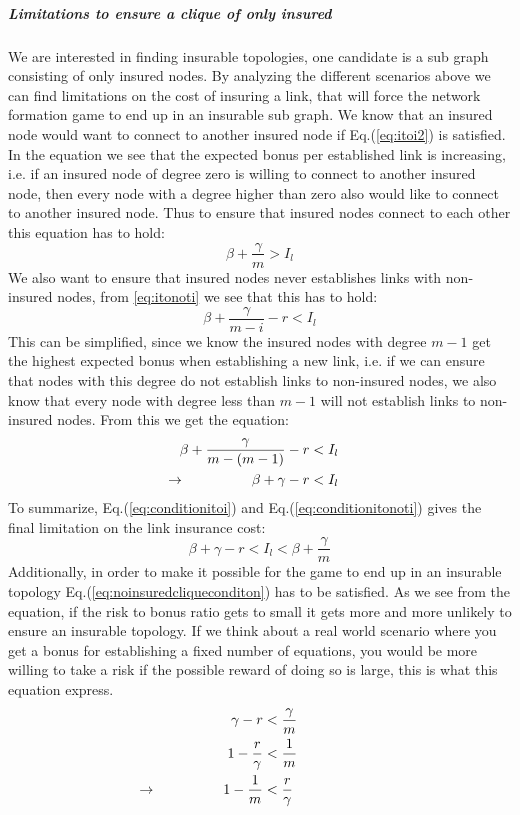 \subparagraph{Limitations to ensure a clique of only insured}
We are interested in finding insurable topologies, one candidate is a sub graph consisting of only insured nodes. By analyzing the different scenarios above we can find limitations on the cost of insuring a link, that will force the network formation game to end up in an insurable sub graph.
We know that an insured node would want to connect to another insured node if  Eq.(\ref{eq:itoi2}) is satisfied. 
In the equation we see that the expected bonus per established link is increasing, i.e. if an insured node of degree zero is willing to connect to another insured node, then every node with a degree higher than zero also would like to connect to another insured node. Thus to ensure that insured nodes connect to each other this equation has to hold:
\begin{equation}
\beta+\frac{\gamma}{m}>I_{l}
\label{eq:conditionitoi}
\end{equation}
We also want to ensure that insured nodes never establishes links with non-insured nodes, from \ref{eq:itonoti} we see that this has to hold:
\begin{equation}
\beta+\frac{\gamma}{m-i}-r < I_{l}
\label{eq:conditionitonoti}
\end{equation}
This can be simplified, since we know the insured nodes with degree $m-1$ get the highest expected bonus when establishing a new link, i.e. if we can ensure that nodes with this degree do not establish links to non-insured nodes, we also know that every node with degree less than $m-1$ will not establish links to non-insured nodes. From this we get the equation:
\begin{eqnarray}
\beta+\frac{\gamma}{m-(m-1)}-r&<I_{l} \nonumber\\
\llap{$\rightarrow$\hspace{50pt}} \beta+\gamma-r&<I_{l}
\label{eq:condition-i-to-noti}
\end{eqnarray}
To summarize, Eq.(\ref{eq:conditionitoi}) and Eq.(\ref{eq:conditionitonoti}) gives the final limitation on the link insurance cost:
\begin{equation}
\beta+\gamma-r<I_{l}<\beta+\frac{\gamma}{m}
\label{eq:final-insurance-clique-condition}
\end{equation}
Additionally, in order to make it possible for the game to end up in an insurable topology Eq.(\ref{eq:noinsuredcliqueconditon}) has to be satisfied. As we see from the equation, if the risk to bonus ratio gets to small it gets more and more unlikely to ensure an insurable topology. If we think about a real world scenario where you get a bonus for establishing a fixed number of equations, you would be more willing to take a risk if the possible reward of doing so is large, this is what this equation express. 
\begin{eqnarray}
\gamma-r &<\frac{\gamma}{m}\nonumber \\
1-\frac{r}{\gamma}&<\frac{1}{m} \nonumber \\
\llap{$\rightarrow$\hspace{50pt}}1-\frac{1}{m}&<\frac{r}{\gamma}
\label{eq:noinsuredcliqueconditon}
\end{eqnarray}

